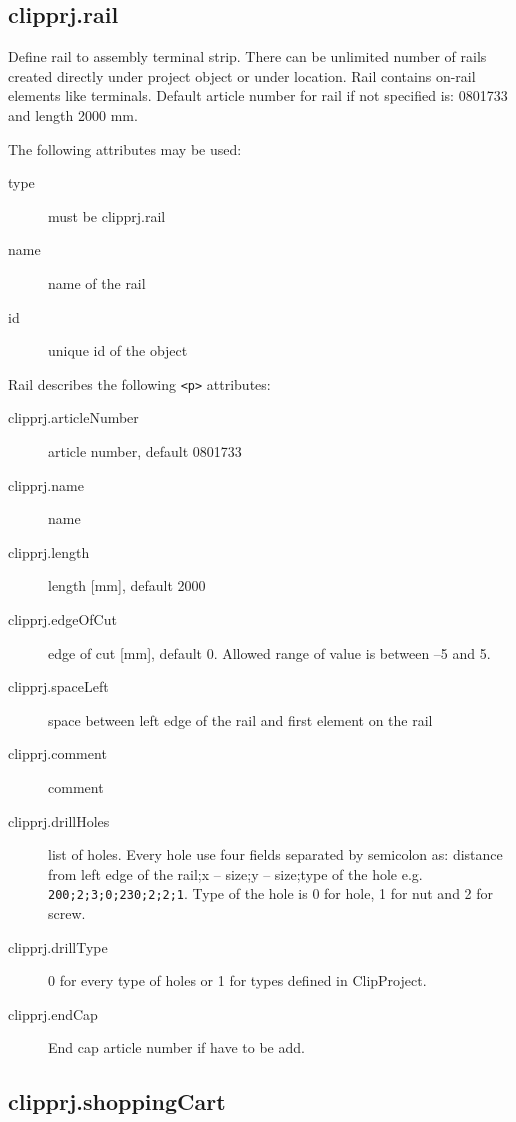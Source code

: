 \documentclass[%
	a4paper,
	oneside,
	listof=numbered,
	parskip=half,
	headsepline=true,
	footsepline=false,
	normalheadings,
	0.7headlines,
	headexclude,
	]{scrbook}
\begin{document}
\subsection{clipprj.rail}

Define rail to assembly terminal strip.
There can be unlimited number of rails created directly under project object or under location.
Rail contains on-rail elements like terminals.
Default article number for rail if not specified is: 0801733 and length 2000 mm.

The following attributes may be used:

\begin{description}
	\item[type] must be clipprj.rail
	\item[name] name of the rail
	\item[id] unique id of the object
\end{description}

Rail describes the following \verb|<p>| attributes: 

\begin{description}
	\item[clipprj.articleNumber] article number, default 0801733 
	\item[clipprj.name] name 
	\item[clipprj.length] length [mm], default 2000 
	\item[clipprj.edgeOfCut] edge of cut [mm], default 0.
	Allowed range of value is between –5 and 5.
	\item[clipprj.spaceLeft] space between left edge of the rail and first element on the rail 
	\item[clipprj.comment] comment 
	\item[clipprj.drillHoles] list of holes.
	Every hole use four fields separated by semicolon as: distance from left edge of the rail;x – size;y – size;type of the hole e.g. \verb|200;2;3;0;230;2;2;1|.
	Type of the hole is 0 for hole, 1 for nut and 2 for screw.
	\item[clipprj.drillType] 0 for every type of holes or 1 for types defined in ClipProject. 
	\item[clipprj.endCap] End cap article number if have to be add. 
\end{description}

\subsection{clipprj.shoppingCart} 
\end{document}
